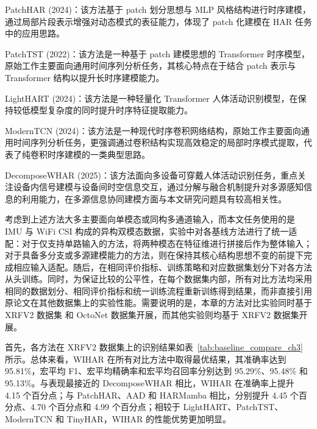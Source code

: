 PatchHAR\cite{wang2024patchhar} (2024)：该方法基于 patch 划分思想与 MLP 风格结构进行时序建模，通过局部片段表示增强对动态模式的表征能力，体现了 patch 化建模在 HAR 任务中的应用思路。

PatchTST\cite{nie2022time} (2022)：该方法是一种基于 patch 建模思想的 Transformer 时序模型，原始工作主要面向通用时间序列分析任务，其核心特点在于结合 patch 表示与 Transformer 结构以提升长时序建模能力。

LightHART\cite{haque2024lighthart} (2024)：该方法是一种轻量化 Transformer 人体活动识别模型，在保持较低模型复杂度的同时提升时序特征提取能力。

ModernTCN\cite{luo2024moderntcn} (2024)：该方法是一种现代时序卷积网络结构，原始工作主要面向通用时间序列分析任务，更强调通过卷积结构实现高效稳定的局部时序模式提取，代表了纯卷积时序建模的一类典型思路。

DecomposeWHAR\cite{xie2025decomposing} (2025)：该方法面向多设备可穿戴人体活动识别任务，重点关注设备内信号建模与设备间时空信息交互，通过分解与融合机制提升对多源感知信息的利用能力，在多源信息协同建模方面与本文研究问题具有较高相关性。

考虑到上述方法大多主要面向单模态或同构多通道输入，而本文任务使用的是 IMU 与 WiFi CSI 构成的异构双模态数据，实验中对各基线方法进行了统一适配：对于仅支持单路输入的方法，将两种模态在特征维进行拼接后作为整体输入；对于具备多分支或多源建模能力的方法，则在保持其核心结构思想不变的前提下完成相应输入适配。随后，在相同评价指标、训练策略和对应数据集划分下对各方法从头训练。同时，为保证比较的公平性，在每个数据集内部，所有对比方法均采用相同的数据划分、相同评价指标和统一训练流程重新训练得到结果，而非直接引用原论文在其他数据集上的实验性能。需要说明的是，本章的方法对比实验同时基于 XRFV2 数据集 和 OctoNet 数据集开展，而其他实验则均基于 XRFV2 数据集开展。

首先，各方法在 XRFV2 数据集上的识别结果如表~\ref{tab:baseline_compare_ch3} 所示。总体来看，WIHAR 在所有对比方法中取得最优结果，其准确率达到 95.81\%，宏平均 F1、宏平均精确率和宏平均召回率分别达到 95.29\%、95.48\% 和 95.13\%。与表现最接近的 DecomposeWHAR 相比，WIHAR 在准确率上提升 4.15 个百分点；与 PatchHAR、AAD 和 HARMamba 相比，分别提升 4.45 个百分点、4.70 个百分点和 4.99 个百分点；相较于 LightHART、PatchTST、ModernTCN 和 TinyHAR，WIHAR 的性能优势更加明显。

